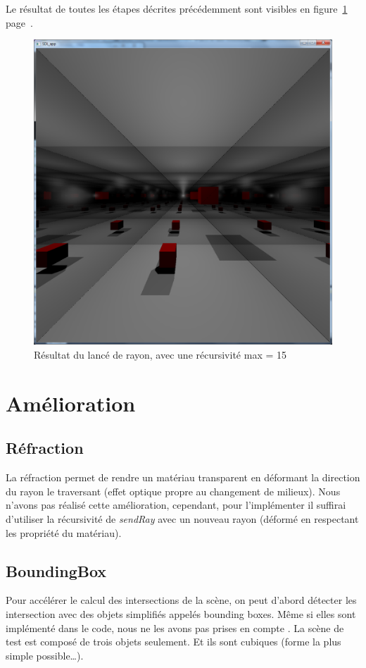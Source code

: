 \documentclass{article}
\begin{document}
Le résultat de toutes les étapes décrites précédemment sont visibles en figure~\ref{result} page~\pageref{result}.
\begin{figure}[!ht]
    \center
    \includegraphics[width=1.00\textwidth]{img/p15.png}
    \caption{Résultat du lancé de rayon, avec une récursivité max = 15}
    \label{result}
\end{figure}

\section{Amélioration}
\subsection{Réfraction}
La réfraction permet de rendre un matériau transparent en déformant la direction du rayon le traversant (effet optique
propre au changement de milieux). Nous n'avons pas réalisé cette amélioration, cependant, pour l'implémenter il
suffirai d'utiliser la récursivité de \textit{sendRay} avec un nouveau rayon (déformé en respectant les propriété du
matériau).

\subsection{BoundingBox}
Pour accélérer le calcul des intersections de la scène, on peut d'abord détecter les intersection avec des objets
simplifiés appelés bounding boxes. Même si elles sont implémenté dans le code, nous ne les avons pas prises en compte
. La scène de test est composé de trois objets seulement. Et ils sont cubiques (forme la plus simple possible\ldots).
\end{document}
